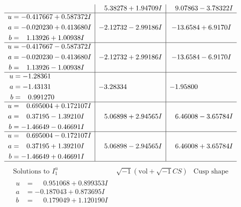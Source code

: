 \documentclass[1p]{elsarticle_modified}
\theoremstyle{definition}
\newcommand{\I}{\sqrt{-1}}
\begin{document}
$$\begin{array}{c|c|c}
 & \phantom{-}5.38278 + 1.94709 I & \phantom{-}9.07863 - 3.78322 I \\ \hline\begin{aligned}
u &= -0.417667 + 0.587372 I \\
a &= -0.020230 + 0.413680 I \\
b &= \phantom{-}1.13926 + 1.00938 I\end{aligned}
 & -2.12732 - 2.99186 I & -13.6584 + 6.9170 I \\ \hline\begin{aligned}
u &= -0.417667 - 0.587372 I \\
a &= -0.020230 - 0.413680 I \\
b &= \phantom{-}1.13926 - 1.00938 I\end{aligned}
 & -2.12732 + 2.99186 I & -13.6584 - 6.9170 I \\ \hline\begin{aligned}
u &= -1.28361\phantom{ +0.000000I} \\
a &= -1.43131\phantom{ +0.000000I} \\
b &= \phantom{-}0.991270\phantom{ +0.000000I}\end{aligned}
 & -3.28334\phantom{ +0.000000I} & -1.95800\phantom{ +0.000000I} \\ \hline\begin{aligned}
u &= \phantom{-}0.695004 + 0.172107 I \\
a &= \phantom{-}0.37195 - 1.39210 I \\
b &= -1.46649 - 0.46691 I\end{aligned}
 & \phantom{-}5.06898 + 2.94565 I & \phantom{-}6.46008 - 3.65784 I \\ \hline\begin{aligned}
u &= \phantom{-}0.695004 - 0.172107 I \\
a &= \phantom{-}0.37195 + 1.39210 I \\
b &= -1.46649 + 0.46691 I\end{aligned}
 & \phantom{-}5.06898 - 2.94565 I & \phantom{-}6.46008 + 3.65784 I\\
 \hline 
 \end{array}$$\newpage$$\begin{array}{c|c|c}  
\text{Solutions to }I^u_{1}& \I (\text{vol} + \sqrt{-1}CS) & \text{Cusp shape}\\
 \hline 
\begin{aligned}
u &= \phantom{-}0.951068 + 0.899353 I \\
a &= -0.187043 + 0.873695 I \\
b &= \phantom{-}0.179049 + 1.120190 I\end{aligned}

\end{array}$$
\end{document}
